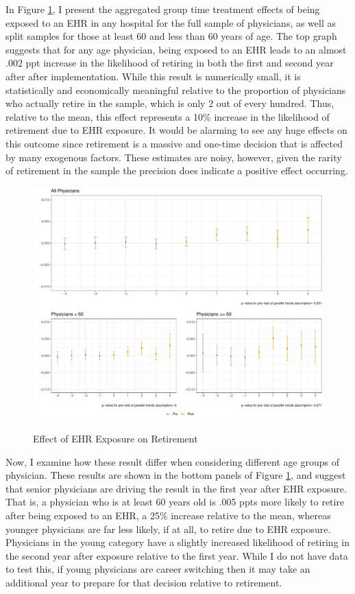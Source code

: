 \documentclass[11pt]{article}
\begin{document}
In Figure \ref{fig:retirefirst}, I present the aggregated group time treatment effects of being exposed to an EHR in any hospital for the full sample of physicians, as well as split samples for those at least 60 and less than 60 years of age. The top graph suggests that for any age physician, being exposed to an EHR leads to an almost .002 ppt increase in the likelihood of retiring in both the first and second year after after implementation. While this result is numerically small, it is statistically and economically meaningful relative to the proportion of physicians who actually retire in the sample, which is only 2 out of every hundred. Thus, relative to the mean, this effect represents a 10\% increase in the likelihood of retirement due to EHR exposure. It would be alarming to see any huge effects on this outcome since retirement is a massive and one-time decision that is affected by many exogenous factors. These estimates are noisy, however, given the rarity of retirement in the sample the precision does indicate a positive effect occurring.

\begin{figure}[ht]
    \centering
    \caption{Effect of EHR Exposure on Retirement}
    \includegraphics[scale=.57]{Objects/retire_plot.pdf}
    \label{fig:retirefirst}
\end{figure}


Now, I examine how these result differ when considering different age groups of physician. These results are shown in the bottom panels of Figure \ref{fig:retirefirst}, and suggest that senior physicians are driving the result in the first year after EHR exposure. That is, a physician who is at least 60 years old is .005 ppts more likely to retire after being exposed to an EHR, a 25\% increase relative to the mean, whereas younger physicians are far less likely, if at all, to retire due to EHR exposure. Physicians in the young category have a slightly increased likelihood of retiring in the second year after exposure relative to the first year. While I do not have data to test this, if young physicians are career switching then it may take an additional year to prepare for that decision relative to retirement.   
\end{document}
